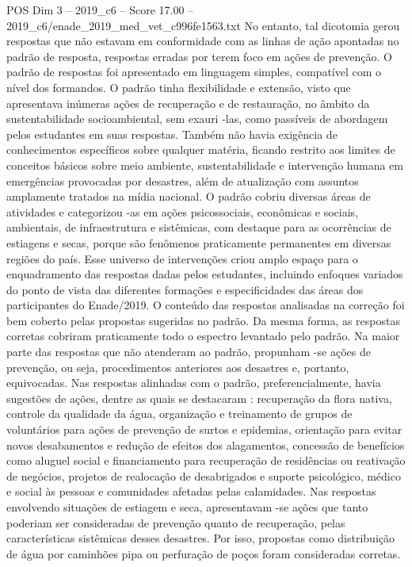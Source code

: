 \begin{textsample}{POS Dim 3 – 2019\_c6 – Score 17.00 – 2019\_c6/enade\_2019\_med\_vet\_c996fe1563.txt}
No entanto, tal dicotomia gerou respostas que não estavam em conformidade com as linhas de ação apontadas no padrão de resposta, respostas erradas por terem foco em ações de prevenção.
O padrão de respostas foi apresentado em linguagem simples, compatível com o nível dos formandos.
O padrão tinha flexibilidade e extensão, visto que apresentava inúmeras ações de recuperação e de restauração, no âmbito da sustentabilidade socioambiental, sem exauri -las, como passíveis de abordagem pelos estudantes em suas respostas.
Também não havia exigência de conhecimentos específicos sobre qualquer matéria, ficando restrito aos limites de conceitos básicos sobre meio ambiente, sustentabilidade e intervenção humana em emergências provocadas por desastres, além de atualização com assuntos amplamente tratados na mídia nacional.
O padrão cobriu diversas áreas de atividades e categorizou -as em ações psicossociais, econômicas e sociais, ambientais, de infraestrutura e sistêmicas, com destaque para as ocorrências de estiagens e secas, porque são fenômenos praticamente permanentes em diversas regiões do país.
Esse universo de intervenções criou amplo espaço para o enquadramento das respostas dadas pelos estudantes, incluindo enfoques variados do ponto de vista das diferentes formações e especificidades das áreas dos participantes do Enade/2019.
O conteúdo das respostas analisadas na correção foi bem coberto pelas propostas sugeridas no padrão.
Da mesma forma, as respostas corretas cobriram praticamente todo o espectro levantado pelo padrão.
Na maior parte das respostas que não atenderam ao padrão, propunham -se ações de prevenção, ou seja, procedimentos anteriores aos desastres e, portanto, equivocadas.
Nas respostas alinhadas com o padrão, preferencialmente, havia sugestões de ações, dentre as quais se destacaram : recuperação da flora nativa, controle da qualidade da água, organização e treinamento de grupos de voluntários para ações de prevenção de surtos e epidemias, orientação para evitar novos desabamentos e redução de efeitos dos alagamentos, concessão de benefícios como aluguel social e financiamento para recuperação de residências ou reativação de negócios, projetos de realocação de desabrigados e suporte psicológico, médico e social às pessoas e comunidades afetadas pelas calamidades.
Nas respostas envolvendo situações de estiagem e seca, apresentavam -se ações que tanto poderiam ser consideradas de prevenção quanto de recuperação, pelas características sistêmicas desses desastres.
Por isso, propostas como distribuição de água por caminhões pipa ou perfuração de poços foram consideradas corretas.

\end{textsample}
